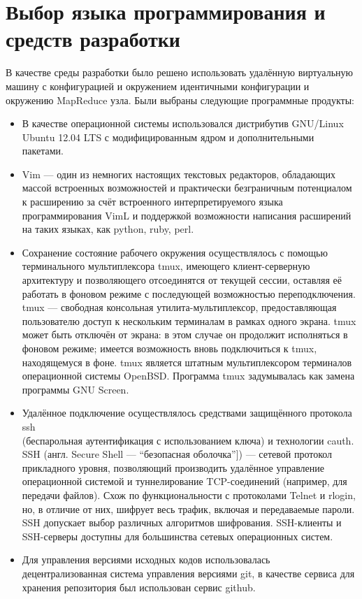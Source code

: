 \section{Выбор языка программирования и средств разработки}
В качестве среды разработки было решено использовать удалённую виртуальную
машину с конфигурацией и окружением идентичными конфигурации и окружению
MapReduce узла. Были выбраны следующие программные продукты:

\begin{itemize}

\item В качестве операционной системы использовался дистрибутив GNU/Linux
  Ubuntu 12.04 LTS с модифицированным ядром и дополнительными пакетами.

\item Vim --- один из немногих настоящих текстовых редакторов,
  обладающих массой встроенных возможностей и практически безграничным
  потенциалом к расширению за счёт встроенного интерпретируемого языка
  программирования VimL и поддержкой возможности написания расширений на
  таких языках, как python, ruby, perl.

\item Сохранение состояние рабочего окружения осуществлялось с помощью
  терминального мультиплексора tmux, имеющего клиент-серверную архитектуру и
  позволяющего отсоединятся от текущей сессии, оставляя её работать в фоновом
  режиме с последующей возможностью переподключения.
  tmux --- свободная консольная утилита-мультиплексор,
  предоставляющая пользователю доступ к нескольким терминалам в рамках
  одного экрана. tmux может быть отключён от экрана: в этом случае он
  продолжит исполняться в фоновом режиме; имеется возможность вновь
  подключиться к tmux, находящемуся в фоне. tmux является штатным
  мультиплексором терминалов операционной системы OpenBSD.
  Программа tmux задумывалась как замена программы GNU Screen.

\item Удалённое подключение осуществлялось средствами защищённого протокола
ssh\\
(беспарольная аутентификация с использованием ключа) и технологии cauth.
SSH (англ. Secure Shell --- ``безопасная оболочка'']) --- сетевой протокол
прикладного уровня, позволяющий производить удалённое управление операционной
системой и туннелирование TCP-соединений (например, для передачи файлов).
Схож по функциональности с протоколами Telnet и rlogin, но, в отличие от них,
шифрует весь трафик, включая и передаваемые пароли. SSH допускает выбор
различных алгоритмов шифрования. SSH-клиенты и SSH-серверы доступны для
большинства сетевых операционных систем.

\item Для управления версиями исходных кодов использовалась децентрализованная
  система управления версиями git, в качестве сервиса для хранения репозитория
  был использован сервис github.

\end{itemize}

